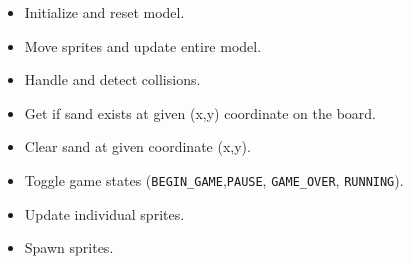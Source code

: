     \begin{itemize}
      \item Initialize and reset model.
      \item Move sprites and update entire model.
      \item Handle and detect collisions.
      \item Get if sand exists at given (x,y) coordinate on the board.
      \item Clear sand at given coordinate (x,y).
      \item Toggle game states (\texttt{BEGIN\_GAME},\texttt{PAUSE}, \texttt{GAME\_OVER}, \texttt{RUNNING}).
      \item Update individual sprites.
      \item Spawn sprites.
    \end{itemize}



